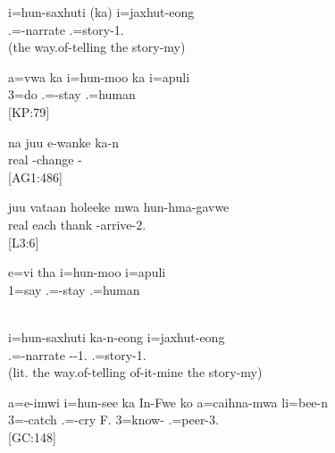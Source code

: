 \ea\label{ex:ka-tr-inan-ov}
\gll	i=hun-saxhuti (ka) i=jaxhut-eong\\
	.=-narrate  .=story-1.\\
\glt	{} (the way.of-telling the story-my)
\z

\ea\label{ex:ka-tr-an-ov}
\gll  a=vwa ka i=hun-moo ka i=apuli\\
 3=do  .=-stay  .=human\\
\glt {} {[KP:79]}
\z



\ea\label{ex:ka-itr-inan-cov}
\gll na juu e-wanke ka-n\\
  real -change -\\
\glt {} {[AG1:486]}
\z


\ea\label{ex:ka-itr-an-cov1}
\gll juu vataan holeeke mwa hun-hma-gavwe \\
 real each thank  -arrive-2.\\
\glt {} {[L3:6]}
\z


\ea\label{ex:ka-itr-an-cov2}
\gll e=vi tha i=hun-moo i=apuli\\
 1=say  .=-stay .=human\\
\glt {}\\
\z


\ea\label{ex:ka-itr-inan-ov}
\gll	i=hun-saxhuti ka-n-eong i=jaxhut-eong\\
	.=-narrate --1. .=story-1.\\
\glt	{} (lit. the way.of-telling of-it-mine the story-my)
\z

\ea\label{ex:ka-itr-an-ov}
\gll a=e-imwi i=hun-see ka In-Fwe ko a=caihna-mwa li=bee-n\\
 3=-catch .=-cry  F.  3=know- .=peer-3.\\
\glt {} {[GC:148]}
\z


